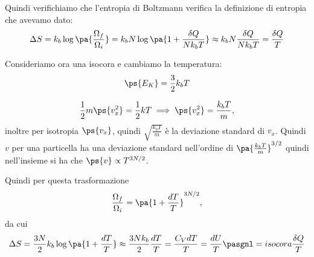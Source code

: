Quindi verifichiamo che l'entropia di Boltzmann verifica la definizione di entropia che avevamo dato:
\[\Delta S=k_b\log\pa{\frac{\Omega_f}{\Omega_i}}=k_b N\log\pa{1+\frac{\delta Q}{Nk_b T}}\approx k_bN\frac{\delta Q}{Nk_bT}=\frac{\delta Q}T\]


Consideriamo ora una isocora e cambiamo la temperatura:
\[\ps{E_K}=\frac32k_bT\]

\[\frac12m\ps{v_x^2}=\frac12 kT\implies \ps{v_x^2}=\frac{k_bT}m,\]
inoltre per isotropia $\ps{v_x}$, quindi $\sqrt{\frac{k_bT}m}$ \`e la deviazione standard di $v_x$.
Quindi $v$ per una particella ha una deviazione standard nell'ordine di $\pa{\frac{k_bT}m}^{3/2}$ quindi nell'insieme si ha che $\ps{v}\propto T^{3N/2}$.

Quindi per questa trasformazione
\[\frac{\Omega_f}{\Omega_i}=\pa{1+\frac{dT}T}^{3N/2},\]
da cui
\[\Delta S=\frac{3N}2k_b\log\pa{1+\frac{dT}T}\approx \frac{3Nk_b}2\frac{dT}T=\frac{C_VdT}T=\frac{dU}T\pasgnl={isocora}\frac{\delta Q}T\]



